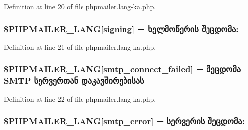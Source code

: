 Definition at line 20 of file phpmailer.\+lang-\/ka.\+php.

\subsubsection[{\texorpdfstring{\$\+P\+H\+P\+M\+A\+I\+L\+E\+R\+\_\+\+L\+A\+NG}{$PHPMAILER_LANG}}]{\setlength{\rightskip}{0pt plus 5cm}\$P\+H\+P\+M\+A\+I\+L\+E\+R\+\_\+\+L\+A\+NG\mbox{[}\textquotesingle{}signing\textquotesingle{}\mbox{]} = \textquotesingle{}ხელმოწერის შეცდომა\+: \textquotesingle{}}\hypertarget{phpmailer_8lang-ka_8php_a68e437bdb9b968a5a67320f03d231565}{}\label{phpmailer_8lang-ka_8php_a68e437bdb9b968a5a67320f03d231565}


Definition at line 21 of file phpmailer.\+lang-\/ka.\+php.

\subsubsection[{\texorpdfstring{\$\+P\+H\+P\+M\+A\+I\+L\+E\+R\+\_\+\+L\+A\+NG}{$PHPMAILER_LANG}}]{\setlength{\rightskip}{0pt plus 5cm}\$P\+H\+P\+M\+A\+I\+L\+E\+R\+\_\+\+L\+A\+NG\mbox{[}\textquotesingle{}smtp\+\_\+connect\+\_\+failed\textquotesingle{}\mbox{]} = \textquotesingle{}შეცდომა {\bf S\+M\+TP} სერვერთან დაკავშირებისას\textquotesingle{}}\hypertarget{phpmailer_8lang-ka_8php_a7b321d4ca1e9df702403ed4c61aa0980}{}\label{phpmailer_8lang-ka_8php_a7b321d4ca1e9df702403ed4c61aa0980}


Definition at line 22 of file phpmailer.\+lang-\/ka.\+php.

\subsubsection[{\texorpdfstring{\$\+P\+H\+P\+M\+A\+I\+L\+E\+R\+\_\+\+L\+A\+NG}{$PHPMAILER_LANG}}]{\setlength{\rightskip}{0pt plus 5cm}\$P\+H\+P\+M\+A\+I\+L\+E\+R\+\_\+\+L\+A\+NG\mbox{[}\textquotesingle{}smtp\+\_\+error\textquotesingle{}\mbox{]} =  სერვერის შეცდომა\+: \textquotesingle{}}\hypertarget{phpmailer_8lang-ka_8php_a7d9cffba1e669c845f8a4c891ee50064}{}\label{phpmailer_8lang-ka_8php_a7d9cffba1e669c845f8a4c891ee50064}


